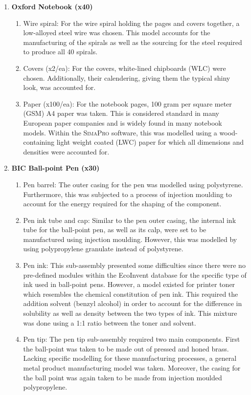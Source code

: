 \begin{enumerate}
    \item \textbf{Oxford Notebook (x40)}
    \begin{enumerate}
        \item Wire spiral: For the wire spiral holding the pages and covers together, a low-alloyed steel wire was chosen. This model accounts for the manufacturing of the spirals as well as the sourcing for the steel required to produce all 40 spirals.
        \item Covers (x2/ea): For the covers, white-lined chipboards (WLC) were chosen. Additionally, their calendering, giving them the typical shiny look, was accounted for.
        \item Paper (x100/ea): For the notebook pages, 100 gram per square meter (GSM) A4 paper was taken. This is considered standard in many European paper companies and is widely found in many notebook models. Within the \textsc{SimaPro} software, this was modelled using a wood-containing light weight coated (LWC) paper for which all dimensions and densities were accounted for.
    \end{enumerate}
    \item \textbf{BIC Ball-point Pen (x30)} \cite{BICballpoint}
    \begin{enumerate}
        \item Pen barrel: The outer casing for the pen was modelled using polystyrene. Furthermore, this was subjected to a process of injection moulding to account for the energy required for the shaping of the component.
        \item Pen ink tube and cap: Similar to the pen outer casing, the internal ink tube for the ball-point pen, as well as its calp, were set to be manufactured using injection moulding. However, this was modelled by using polypropylene granulate instead of polystyrene.
        \item Pen ink: This sub-assembly presented some difficulties since there were no pre-defined modules within the EcoInvent database for the specific type of ink used in ball-point pens. However, a model existed for printer toner which resembles the chemical constitution of pen ink. This required the addition solvent (benzyl alcohol) in order to account for the difference in solubility as well as density between the two types of ink. This mixture was done using a 1:1 ratio between the toner and solvent.
        \item Pen tip: The pen tip sub-assembly required two main components. First the ball-point was taken to be made out of pressed and honed brass. Lacking specific modelling for these manufacturing processes, a general metal product manufacturing model was taken. Moreover, the casing for the ball point was again taken to be made from injection moulded polypropylene.
    \end{enumerate}
\end{enumerate}

